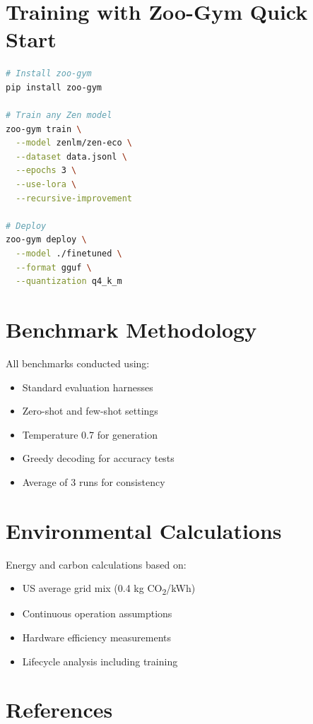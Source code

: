 \documentclass[11pt,a4paper]{article}
\begin{document}
\section{Training with Zoo-Gym Quick Start}

\begin{lstlisting}[language=bash]
# Install zoo-gym
pip install zoo-gym

# Train any Zen model
zoo-gym train \
  --model zenlm/zen-eco \
  --dataset data.jsonl \
  --epochs 3 \
  --use-lora \
  --recursive-improvement

# Deploy
zoo-gym deploy \
  --model ./finetuned \
  --format gguf \
  --quantization q4_k_m
\end{lstlisting}

\section{Benchmark Methodology}

All benchmarks conducted using:
\begin{itemize}
    \item Standard evaluation harnesses
    \item Zero-shot and few-shot settings
    \item Temperature 0.7 for generation
    \item Greedy decoding for accuracy tests
    \item Average of 3 runs for consistency
\end{itemize}

\section{Environmental Calculations}

Energy and carbon calculations based on:
\begin{itemize}
    \item US average grid mix (0.4 kg CO\textsubscript{2}/kWh)
    \item Continuous operation assumptions
    \item Hardware efficiency measurements
    \item Lifecycle analysis including training
\end{itemize}

\section*{References}
\end{document}
